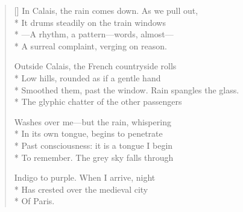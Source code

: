 \label{ch:across_france}
\settowidth{\versewidth}{Smoothed them, past the window.   Rain spangles the glass.}
\begin{verse}[\versewidth]
In Calais, the rain comes down. As we pull out,\\*
It drums steadily on the train windows\\*
---A rhythm, a pattern---words, almost---\\*
A surreal complaint, verging on reason.

Outside Calais, the French countryside rolls\\*
Low hills, rounded as if a gentle hand\\*
Smoothed them, past the window.   Rain spangles the glass.\\*
The glyphic chatter of the other passengers

Washes over me---but the rain, whispering\\*
In its own tongue, begins to penetrate\\*
Past consciousness: it is a tongue I begin\\*
To remember.  The grey sky falls through

Indigo to purple. When I arrive, night\\*
Has crested over the medieval city\\*
\hspace*{2\vgap} Of Paris.
\end{verse}
